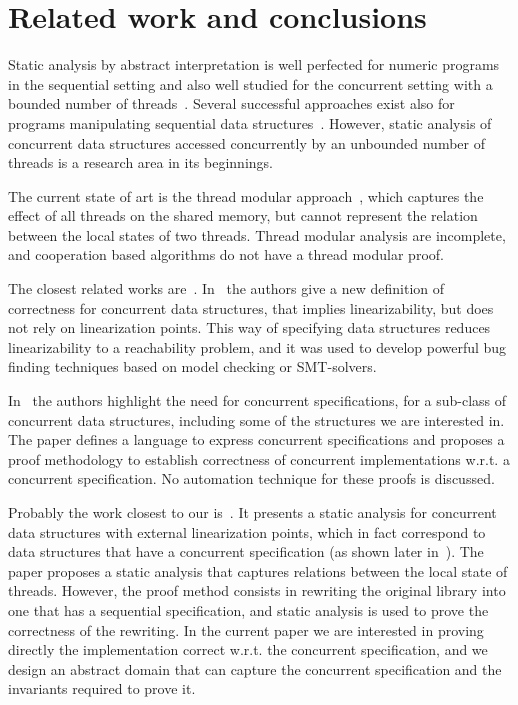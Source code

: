 \section{Related work and conclusions}
\label{sec:relwork}

Static analysis by abstract interpretation is well perfected for numeric programs in the sequential setting and also well studied for the concurrent setting with a bounded number of threads~\cite{mine15,DBLP:journals/lisp/Mine06,DBLP:conf/popl/CousotH78}. 
Several successful approaches exist also for programs manipulating  sequential data structures~\cite{SagivRW02,LiBCR17,pldi11}. 
However, static analysis of concurrent data structures accessed concurrently by an unbounded number of threads is a research area in its beginnings. 

The current state of art is the thread modular approach~\cite{threadmodular,Vafeiadis09,vv1}, which  captures the effect of all threads on the shared memory, but cannot represent the relation between the local states of two threads.  Thread modular analysis are incomplete, and cooperation based algorithms do not have a thread modular proof. 

The closest related works are~\cite{cav13,ee1,ee2,ee3,disc15}. 
In~\cite{ee1,ee2,ee3} the authors give a new definition of correctness for concurrent data structures, that implies linearizability, but does not rely on linearization points.  This way of specifying data structures  reduces linearizability to a reachability problem, and it was used to develop powerful bug finding techniques based on model checking or SMT-solvers. 

In~\cite{disc15} the authors highlight the need for concurrent specifications, for a sub-class of concurrent data structures, including some of the structures we are interested in. The paper defines a language to express concurrent specifications and proposes a proof methodology to establish correctness of concurrent implementations w.r.t. a concurrent specification.  No automation technique for these proofs is discussed.  

Probably the work closest to our is~\cite{cav13}. It presents a static analysis for concurrent data structures with external linearization points, which in fact correspond to data structures that have a concurrent specification (as shown later in~\cite{disc15}).  
The paper proposes a static analysis that captures relations between the local state of threads.  
However, the proof method consists in rewriting the original library into one that has a sequential specification, and static analysis is used to prove the correctness of the rewriting. In the current paper we are interested in proving directly the implementation correct w.r.t. the concurrent specification, and we design an abstract domain that can capture the concurrent specification and the invariants required to prove it. 


